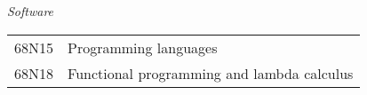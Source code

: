 {\it Software} \\[4pt]
\begin{tabular}{ll}
\phantom{XX} 68N15   &  Programming languages\\
\phantom{XX} 68N18   &  Functional programming and lambda calculus \\ %

\end{tabular}
